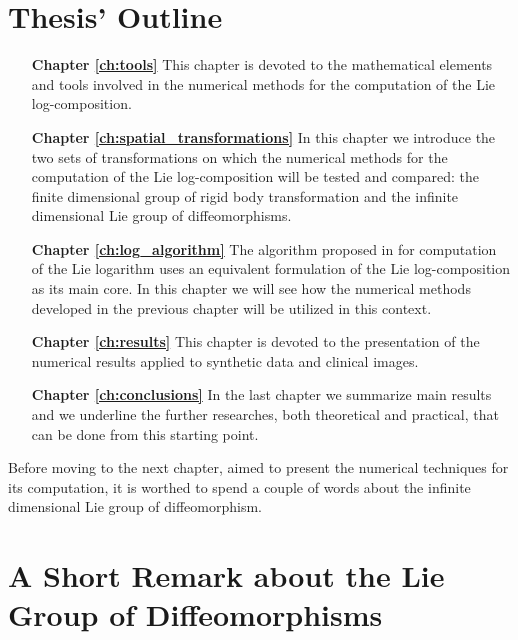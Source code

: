 \section{Thesis' Outline}\label{se:thesis_outline}
\begin{enumerate}
	
	\item[{\bf Chapter \ref{ch:tools}}] This chapter is devoted to the mathematical elements and tools involved in the numerical methods for the computation of the Lie log-composition.
	
	\item[{\bf Chapter \ref{ch:spatial_transformations}}] In this chapter we introduce the two sets of transformations on which the numerical methods for the computation of the Lie log-composition will be tested and compared: the finite dimensional group of rigid body transformation and the infinite dimensional Lie group of diffeomorphisms.

	\item[{\bf Chapter \ref{ch:log_algorithm}}] The algorithm proposed in \cite{bossa2008algorithms} for computation of the Lie logarithm uses an equivalent formulation of the Lie log-composition as its main core. In this chapter we will see how the numerical methods developed in the previous chapter will be utilized in this context.
  
	\item[{\bf Chapter \ref{ch:results}}] This chapter is devoted to the presentation of the numerical results applied to synthetic data and clinical images. 
	
	\item[{\bf Chapter \ref{ch:conclusions}}] In the last chapter we summarize main results and we underline the further researches, both theoretical and practical, that can be done from this starting point.
	
\end{enumerate}

Before moving to the next chapter, aimed to present the numerical techniques for its computation, it is worthed to spend a couple of words about the infinite dimensional Lie group of diffeomorphism.

\section*{A Short Remark about the Lie Group of Diffeomorphisms}\label{remark_diff}

